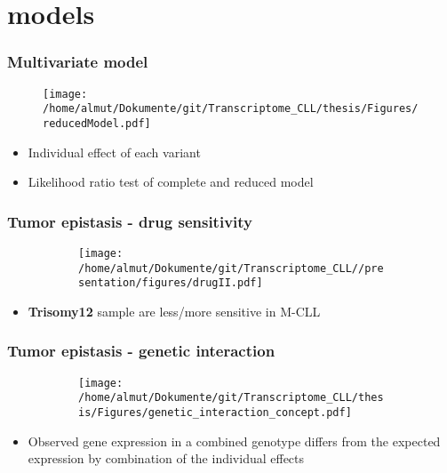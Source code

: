 \documentclass[xcolor=dvipsnames,t,10pt]{beamer}
\begin{document}
\section{models}
%
%
\begin{frame}[c]
	\frametitle{Multivariate model}
	\begin{minipage}[t]{.67\textwidth}
		\begin{figure}
		\texttt{[image: /home/almut/Dokumente/git/Transcriptome\_CLL/thesis/Figures/reducedModel.pdf]}
	\end{figure}
	\end{minipage}
	\begin{minipage}[t]{.3\textwidth}
		\begin{itemize}
		\item Individual effect of each variant
		\item Likelihood ratio test of complete and reduced model
	\end{itemize}
	\end{minipage}
\end{frame}
% 
%
\begin{frame}[c]
	\frametitle{Tumor epistasis - drug sensitivity}
	\begin{figure}
		\centering
		\begin{subfigure}[t]{0.65\columnwidth}
			\texttt{[image: /home/almut/Dokumente/git/Transcriptome\_CLL//presentation/figures/drugII.pdf]}
		\end{subfigure}
		\hfill
	\end{figure}
	\begin{itemize}
		\item \textbf{Trisomy12} sample are less/more sensitive in M-CLL
	\end{itemize}
\end{frame}
%
%
\begin{frame}[c]
	\frametitle{Tumor epistasis - genetic interaction}
	\begin{figure}
		\centering
		\begin{subfigure}[t]{0.45\columnwidth}
			\texttt{[image: /home/almut/Dokumente/git/Transcriptome\_CLL/thesis/Figures/genetic\_interaction\_concept.pdf]}
		\end{subfigure}
	\end{figure}
	\begin{itemize}
		\item Observed gene expression in a combined genotype differs from the expected expression by combination of the individual effects
	\end{itemize}
\end{frame}
\end{document}
